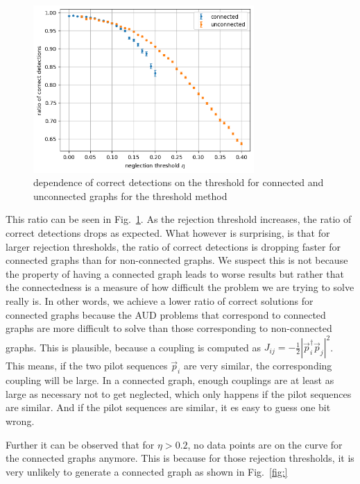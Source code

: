 \documentclass{article}
\begin{document}
	\begin{figure}[h]
		\centering
		\includegraphics[width=0.75\textwidth]{img/connected_unconnected_rule_1.png}
		\caption{dependence of correct detections on the threshold for connected and unconnected graphs for the threshold method}
		\label{fig:connected unconnected rule 1}
	\end{figure}
	This ratio can be seen in Fig.~\ref{fig:connected unconnected rule 1}. As the rejection threshold increases, the ratio of correct detections drops as expected. What however is surprising, is that for larger rejection thresholds, the ratio of correct detections is dropping faster for connected graphs than for non-connected graphs. We suspect this is not because the property of having a connected graph leads to worse results but rather that the connectedness is a measure of how difficult the problem we are trying to solve really is. In other words, we achieve a lower ratio of correct solutions for connected graphs because the AUD problems that correspond to connected graphs are more difficult to solve than those corresponding to non-connected graphs. This is plausible, because a coupling is computed as $J_{ij} = -\frac{1}{2}|\vec p_i^\dagger \vec p_j|^2$. This means, if the two pilot sequences $\vec p_i$ are very similar, the corresponding coupling will be large. In a connected graph, enough couplings are at least as large as necessary not to get neglected, which only happens if the pilot sequences are similar. And if the pilot sequences are similar, it es easy to guess one bit wrong. 
	
	Further it can be observed that for $\eta>0.2$, no data points are on the curve for the connected graphs anymore. This is because for those rejection thresholds, it is very unlikely to generate a connected graph as shown in Fig.~\ref{fig:}
	
\end{document}
